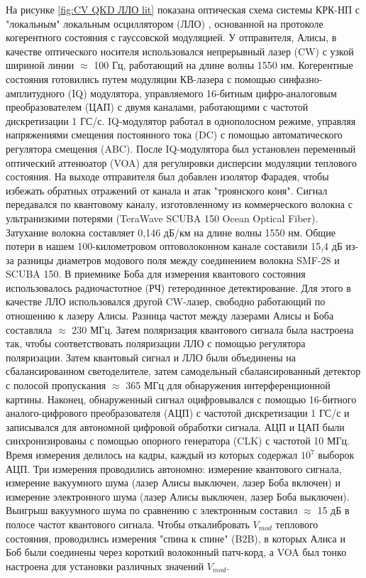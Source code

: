 На рисунке \ref{fig:CV QKD ЛЛО lit} показана оптическая схема  системы КРК-НП с "локальным" локальным осциллятором (ЛЛО) \cite{hajomer2024}, основанной на протоколе когерентного состояния с гауссовской модуляцией. У отправителя, Алисы, в качестве оптического носителя использовался непрерывный лазер (CW) с узкой шириной линии $\approx$ 100 Гц, работающий на длине волны 1550 нм. Когерентные состояния готовились путем модуляции КВ-лазера с помощью синфазно-амплитудного (IQ) модулятора, управляемого 16-битным цифро-аналоговым преобразователем (ЦАП) с двумя каналами, работающими с частотой дискретизации 1 ГС/с. IQ-модулятор работал в однополосном режиме, управляя напряжениями смещения постоянного тока (DC) с помощью автоматического регулятора смещения (ABC). После IQ-модулятора был установлен переменный оптический аттенюатор (VOA) для регулировки дисперсии модуляции теплового состояния. На выходе отправителя был добавлен изолятор Фарадея, чтобы избежать обратных отражений от канала и атак "троянского коня". Сигнал передавался по квантовому каналу, изготовленному из коммерческого волокна с ультранизкими потерями (TeraWave SCUBA 150 Ocean Optical Fiber). Затухание волокна составляет 0,146 дБ/км на длине волны 1550 нм. Общие потери в нашем 100-километровом оптоволоконном канале составили 15,4 дБ из-за разницы диаметров модового поля между соединением волокна SMF-28 и SCUBA 150.
В приемнике Боба для измерения квантового состояния использовалось радиочастотное (РЧ) гетеродинное детектирование. Для этого в качестве ЛЛО использовался другой CW-лазер, свободно работающий по отношению к лазеру Алисы. Разница частот между
лазерами Алисы и Боба составляла $\approx$ 230 МГц. Затем поляризация квантового сигнала была настроена так, чтобы соответствовать поляризации ЛЛО с помощью регулятора поляризации. Затем квантовый сигнал и ЛЛО были объединены на сбалансированном светоделителе,
затем самодельный сбалансированный детектор с полосой пропускания
$\approx$ 365 МГц для обнаружения интерференционной картины. Наконец, обнаруженный сигнал оцифровывался с помощью 16-битного аналого-цифрового преобразователя (АЦП) с частотой дискретизации 1 ГС/с и записывался для автономной цифровой обработки сигнала. АЦП и ЦАП были синхронизированы с помощью опорного генератора (CLK) с частотой 10 МГц.
Время измерения делилось на кадры, каждый из которых содержал $10^7$ выборок АЦП. Три измерения проводились автономно: измерение квантового сигнала, измерение вакуумного шума (лазер Алисы выключен, лазер Боба включен) и измерение электронного шума (лазер Алисы выключен, лазер Боба выключен). Выигрыш вакуумного шума по сравнению с электронным составил $\approx$ 15 дБ в полосе частот квантового сигнала. Чтобы откалибровать $V_{mod}$ теплового состояния, проводились измерения "спина к спине" (B2B), в которых Алиса и Боб были соединены через короткий волоконный патч-корд, а VOA был тонко настроена для установки различных значений $V_{mod}$.
